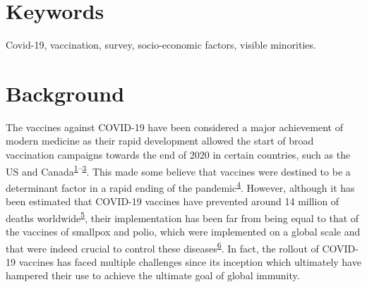 \documentclass[
  letterpaper,
  DIV=11,
  numbers=noendperiod]{scrartcl}
\begin{document}
\hypertarget{keywords}{%
\section*{Keywords}\label{keywords}}

Covid-19, vaccination, survey, socio-economic factors, visible
minorities.

\hypertarget{background}{%
\section{Background}\label{background}}

The vaccines against COVID-19 have been considered a major achievement
of modern medicine as their rapid development allowed the start of broad
vaccination campaigns towards the end of 2020 in certain countries, such
as the US and
Canada\textsuperscript{\protect\hyperlink{ref-davis2022}{1}--\protect\hyperlink{ref-tanne2020}{3}}.
This made some believe that vaccines were destined to be a determinant
factor in a rapid ending of the
pandemic\textsuperscript{\protect\hyperlink{ref-thelancet2021}{4}}.
However, although it has been estimated that COVID-19 vaccines have
prevented around 14 million of deaths
worldwide\textsuperscript{\protect\hyperlink{ref-watson2022}{5}}, their
implementation has been far from being equal to that of the vaccines of
smallpox and polio, which were implemented on a global scale and that
were indeed crucial to control these
diseases\textsuperscript{\protect\hyperlink{ref-kayser2021}{6}}. In
fact, the rollout of COVID-19 vaccines has faced multiple challenges
since its inception which ultimately have hampered their use to achieve
the ultimate goal of global immunity.
\end{document}
